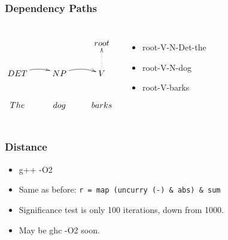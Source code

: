 \documentclass{beamer}
\begin{document}
\begin{frame}
  \frametitle{Dependency Paths}

\begin{columns}
\[\xymatrix{
& & root \\
DET \ar@/^/[r] & NP\ar@/^/[r] & V \ar@{.>}[u] \\
The & dog & barks
}
\]
\begin{itemize}
\item root-V-N-Det-the
\item root-V-N-dog
\item root-V-barks
\end{itemize}
\end{columns}

\end{frame}
\begin{frame}[fragile]
  \frametitle{Distance}
 \begin{itemize}
  \item g++ -O2
  \item Same as before: \verb+r = map (uncurry (-) & abs) & sum+
  \item Significance test is only 100 iterations, down from 1000.
  \item May be ghc -O2 soon.
 \end{itemize}
\end{frame}
\end{document}
